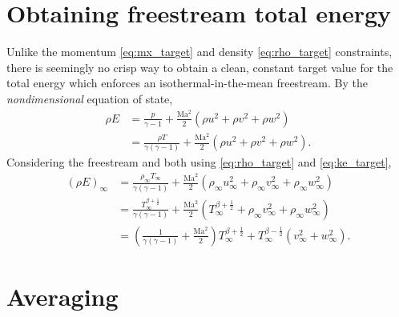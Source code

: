 \documentclass[letterpaper,11pt,nointlimits,reqno]{amsart}
\newcommand{\Mach}[1][]{\mbox{Ma}_{#1}}
\begin{document}
\section{Obtaining freestream total energy}

Unlike the momentum \eqref{eq:mx_target} and density \eqref{eq:rho_target}
constraints, there is seemingly no crisp way to obtain a clean, constant target
value for the total energy which enforces an isothermal-in-the-mean freestream.
By the \emph{nondimensional} equation of state,
\begin{align}
  \rho E &= \frac{p}{\gamma-1}
          + \frac{\Mach^2}{2}\left(\rho{}u^2 + \rho{}v^2 + \rho{}w^2\right)
\\
         &= \frac{\rho T}{\gamma\left(\gamma-1\right)}
          + \frac{\Mach^2}{2}\left(\rho{}u^2 + \rho{}v^2 + \rho{}w^2\right)
.
\end{align}
Considering the freestream and both using \eqref{eq:rho_target} and
\eqref{eq:ke_target},
\begin{align}
  \left(\rho E\right)_\infty
         &= \frac{\rho_\infty T_\infty}{\gamma\left(\gamma-1\right)}
          + \frac{\Mach^2}{2}\left(  \rho_\infty u_\infty^2
                                   + \rho_\infty v_\infty^2
                                   + \rho_\infty w_\infty^2\right)
\\
         &= \frac{T_\infty^{\beta+\frac{1}{2}}}{\gamma\left(\gamma-1\right)}
          + \frac{\Mach^2}{2}\left(  T_\infty^{\beta+\frac{1}{2}}
                                   + \rho_\infty v_\infty^2
                                   + \rho_\infty w_\infty^2\right)
\\
\label{eq:e_target}
         &= \left(  \frac{1}{\gamma\left(\gamma-1\right)}
                  + \frac{\Mach^2}{2} \right)
             T_\infty^{\beta+\frac{1}{2}}
          + T_\infty^{\beta-\frac{1}{2}} \left(v_\infty^2 + w_\infty^2\right)
.
\end{align}

\section{Averaging}
\end{document}
